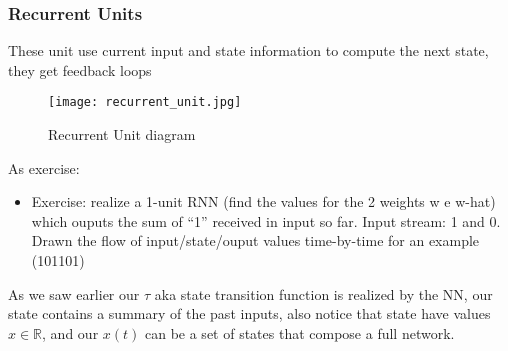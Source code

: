 \documentclass[12pt]{book}
\begin{document}
\subsubsection{Recurrent Units}
These unit use current input and state information to compute the next state, they get feedback loops

\begin{figure}[h]
	\centering
	\texttt{[image: recurrent\_unit.jpg]}
	\caption{Recurrent Unit diagram}
	\label{fig:recurrent_unit_diagram}
\end{figure}

As exercise: \newline
\begin{itemize}
	\item Exercise: realize a 1-unit RNN (find the values for the 2 weights w e w-hat) which ouputs the sum of “1” received in input so far. Input stream: 1 and 0. Drawn the flow of input/state/ouput values time-by-time for an example (101101)
\end{itemize}


As we saw earlier our $\tau$ aka state transition function is realized by the NN, our state contains a summary of the past inputs, also notice that state have values $x \in \mathbb{R}$, and our $x(t)$ can be a set of states that compose a full network. 
\end{document}
